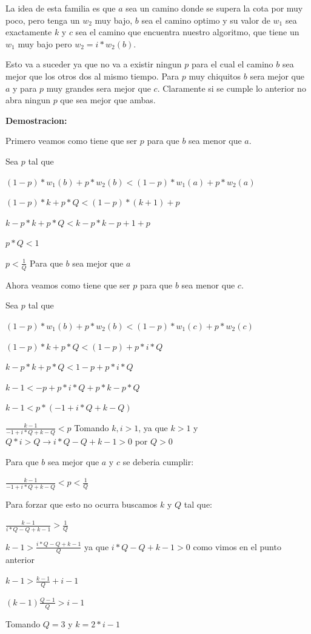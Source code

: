 La idea de esta familia es que $a$ sea un camino donde se supera la cota por muy poco, pero tenga un $w_2$ muy bajo, $b$ sea el camino optimo y su valor de $w_1$ sea exactamente $k$ y $c$ sea el camino que encuentra nuestro algoritmo, que tiene un $w_1$ muy bajo pero $w_2 = i * w_2(b)$.

Esto va a suceder ya que no va a existir ningun $p$ para el cual el camino $b$ sea mejor que los otros dos al mismo tiempo. Para $p$ muy chiquitos $b$ sera mejor que $a$ y para $p$ muy grandes sera mejor que $c$. Claramente si se cumple lo anterior no abra ningun $p$ que sea mejor que ambas.

\textbf{Demostracion:}

Primero veamos como tiene que ser $p$ para que $b$ sea menor que $a$.

Sea $p$ tal que 

$(1-p)*w_1(b)+p*w_2(b) < (1-p)*w_1(a)+p*w_2(a)$

$(1-p)*k+p*Q < (1-p)*(k+1)+p$

$k-p*k+p*Q < k-p*k-p+1+p$

$p*Q < 1$

$p < \frac{1}{Q}$ Para que $b$ sea mejor que $a$

Ahora veamos como tiene que ser $p$ para que $b$ sea menor que $c$.

Sea $p$ tal que 

$(1-p)*w_1(b)+p*w_2(b) < (1-p)*w_1(c)+p*w_2(c)$

$(1-p)*k+p*Q < (1-p)+p*i*Q$

$k-p*k+p*Q < 1-p+p*i*Q$

$k-1 < -p+p*i*Q+p*k-p*Q$

$k-1 < p*(-1+i*Q+k-Q)$

$\frac{k-1}{-1+i*Q+k-Q} < p$ Tomando $k,i > 1$, ya que $k > 1$ y $Q*i > Q \rightarrow i*Q-Q+k-1 > 0$ por $Q > 0$

Para que $b$ sea mejor que $a$ y $c$ se deberia cumplir:

$\frac{k-1}{-1+i*Q+k-Q} < p < \frac{1}{Q}$

Para forzar que esto no ocurra buscamos $k$ y $Q$ tal que:

$\frac{k-1}{i*Q-Q+k-1} > \frac{1}{Q}$

$k-1 > \frac{i*Q-Q+k-1}{Q}$ ya que $i*Q-Q+k-1 > 0$ como vimos en el punto anterior

$k-1 > \frac{k-1}{Q}+i-1$

$(k-1) \frac{Q-1}{Q} > i-1$

Tomando $Q=3$ y $k=2*i-1$

